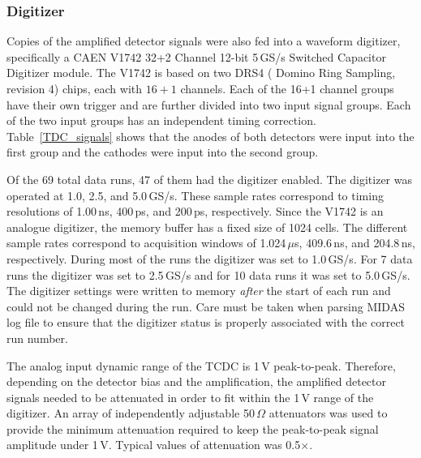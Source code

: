 \subsubsection{Digitizer}Copies of the amplified detector signals were also fed into a waveform digitizer, specifically a CAEN V1742 32+2 Channel 12-bit 5\,GS/s Switched Capacitor Digitizer module. 
The V1742 is based on two DRS4 (%
Domino Ring Sampling, revision 4) %
 chips, each with $16+1$ channels.  %
Each of the 16+1 channel groups have their own trigger and are further divided into two input signal groups. %
Each of the two input groups has an independent timing correction. Table~\ref{TDC_signals} shows that the anodes of both detectors were input into the first group and the cathodes were input into the second group.

Of the 69 total data runs, 47 of them had the digitizer enabled.
 The digitizer was operated at 1.0, 2.5, and 5.0\,GS/s.  These sample rates correspond to timing resolutions of 1.00\,ns, 400\,ps, and 200\,ps, respectively.
 Since the V1742 is an analogue digitizer, the memory buffer has a fixed size of 1024 cells. The different sample rates correspond to acquisition windows of 1.024\,$\mu$s, 409.6\,ns, and 204.8\,ns, respectively.
 During most of the runs the digitizer was set to 1.0\,GS/s. For 7 data runs the digitizer was set to 2.5\,GS/s and for 10 data runs it was set to 5.0\,GS/s.  The digitizer settings were written to memory \textit{after} the start of each run and could not be changed during the run. Care must be taken when parsing MIDAS log file to ensure that the digitizer status  is properly associated with the correct run number.
 
 The analog input dynamic range of the TCDC is 1\,V peak-to-peak.  Therefore, depending on the detector bias and the amplification, the amplified detector signals needed to be attenuated in order to fit within the 1\,V range of the digitizer.  An array of independently adjustable 50\,$\Omega$ attenuators was used to provide the minimum attenuation required to keep the peak-to-peak signal amplitude under 1\,V.  Typical values of attenuation was 0.5$\times$.
	
